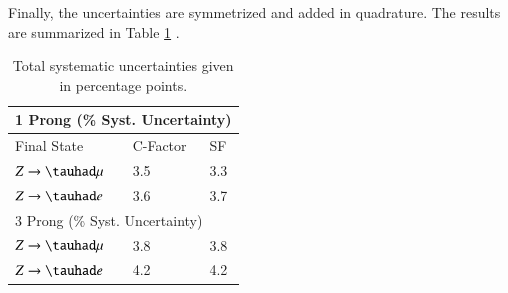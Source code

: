Finally, the uncertainties are symmetrized and added in quadrature. The results are summarized in Table \ref{totalsys} .
\begin{table}[]
	\centering
	\begin{tabular}{|lll|}
		\hline
		\multicolumn{3}{|l|}{1 Prong (\% Syst. Uncertainty)}                         \\ \hline
		\multicolumn{1}{|l|}{Final State}      & \multicolumn{1}{l|}{C-Factor} & SF  \\ \hline
		\multicolumn{1}{|l|}{$Z\to\tauhad\mu$} & \multicolumn{1}{l|}{3.5}      & 3.3 \\ \hline
		\multicolumn{1}{|l|}{$Z\to\tauhad e$}  & \multicolumn{1}{l|}{3.6}      & 3.7 \\ \hline
		\multicolumn{3}{|l|}{3 Prong (\% Syst. Uncertainty)}                         \\ \hline
		\multicolumn{1}{|l|}{$Z\to\tauhad\mu$} & \multicolumn{1}{l|}{3.8}      & 3.8 \\ \hline
		\multicolumn{1}{|l|}{$Z\to\tauhad e$}  & \multicolumn{1}{l|}{4.2}      & 4.2 \\ \hline
	\end{tabular}
	\caption{Total systematic uncertainties given in percentage points.}
	\label{totalsys}
\end{table}